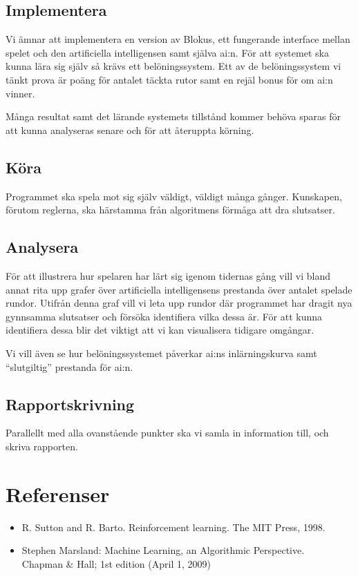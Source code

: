 \documentclass[a4paper,11pt]{article}
\begin{document}
\subsection*{Implementera}

Vi ämnar att implementera en version av Blokus, ett fungerande interface mellan spelet och den artificiella intelligensen samt själva ai:n. För att systemet ska kunna lära sig själv så krävs ett belöningssystem. Ett av de belöningssystem vi tänkt prova är poäng för antalet täckta rutor samt en rejäl bonus för om ai:n vinner.

Många resultat samt det lärande systemets tillstånd kommer behöva sparas för att kunna analyseras senare och för att återuppta körning.

\subsection*{Köra}

Programmet ska spela mot sig själv väldigt, väldigt många gånger. Kunskapen, förutom reglerna, ska härstamma från algoritmens förmåga att dra slutsatser.

\subsection*{Analysera}

För att illustrera hur spelaren har lärt sig igenom tidernas gång vill vi bland annat rita upp grafer över artificiella intelligensens prestanda över antalet spelade rundor. Utifrån denna graf vill vi leta upp rundor där programmet har dragit nya gynnsamma slutsatser och försöka identifiera vilka dessa är. För att kunna identifiera dessa blir det viktigt att vi kan visualisera tidigare omgångar.

Vi vill även se hur belöningssystemet påverkar ai:ns inlärningskurva samt ``slutgiltig'' prestanda för ai:n.

\subsection*{Rapportskrivning}

Parallellt med alla ovanstående punkter ska vi samla in information till, och skriva rapporten.

\section*{Referenser}

\begin{itemize}
\item R. Sutton and R. Barto. Reinforcement learning. The MIT Press, 1998.

\item Stephen Marsland: Machine Learning, an Algorithmic Perspective. \\ Chapman \& Hall; 1st edition (April 1, 2009)
\end{itemize}
\end{document}
